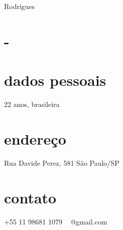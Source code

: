 \documentclass[espanol]{cv-style}     %
\begin{document}
 {Rodrigues}
\lastupdated

\begin{aside}
\section{-}
\section{dados pessoais}
%
22 anos, brasileira
%
\section{endereço}
Rua Davide Perez, 581
São Paulo/SP
~
\section{contato}
+55 11 98681 1079
~
\textbf{}@gmail.com
~

\end{aside}
\end{document}
